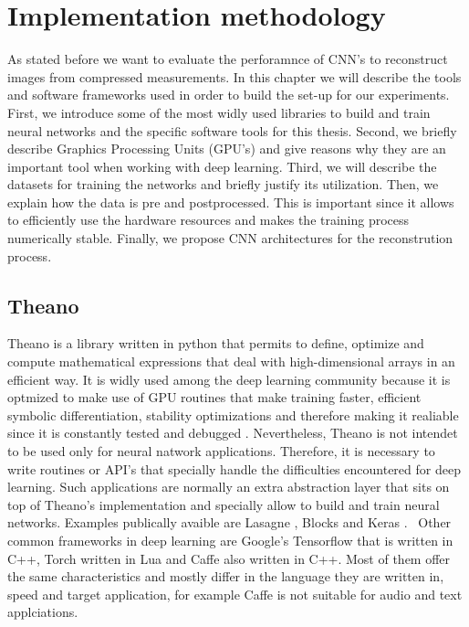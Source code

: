 \chapter{Implementation methodology}
As stated before we want to evaluate the perforamnce of CNN's to reconstruct images from compressed measurements. In this chapter we will describe the tools and software frameworks used in order to build the set-up for our experiments. First,  we introduce some of the most widly used libraries to build and train neural networks and the specific software tools for this thesis. Second, we briefly describe Graphics Processing Units (GPU's) and give reasons why they are an important tool when working with deep learning. Third, we will describe the datasets for training the networks and briefly justify its utilization. Then, we explain how the data is pre and postprocessed. This is important since it allows to efficiently use the hardware resources and makes the training process numerically stable. Finally, we propose CNN architectures for the reconstrution process.   

\section{Theano}
Theano is a library written in python that permits to define, optimize and compute mathematical expressions that deal with high-dimensional arrays in an efficient way. It is widly used among the deep learning community because it is optmized to make use of GPU routines that make training faster, efficient symbolic differentiation, stability optimizations and therefore making it realiable since it is constantly tested and debugged \cite{2016arXiv160502688short}. Nevertheless, Theano is not intendet to be used only for neural natwork applications. Therefore, it is necessary to write routines or API's that specially handle the difficulties encountered for deep learning. Such applications are normally an extra abstraction layer that sits on top of Theano's implementation and specially allow to build and train neural networks. Examples publically avaible are Lasagne \cite{sander_dieleman_2015_27878}, Blocks \cite{van2015blocks} and Keras \cite{chollet2015keras}. \
Other common frameworks in deep learning are Google's Tensorflow \cite{tensorflow2015-whitepaper} that is written in C++, Torch \cite{torch} written in Lua and Caffe \cite{jia2014caffe} also written in C++. Most of them offer the same characteristics and mostly differ in the language they are written in, speed and target application, for example Caffe is not suitable for audio and text applciations.           
